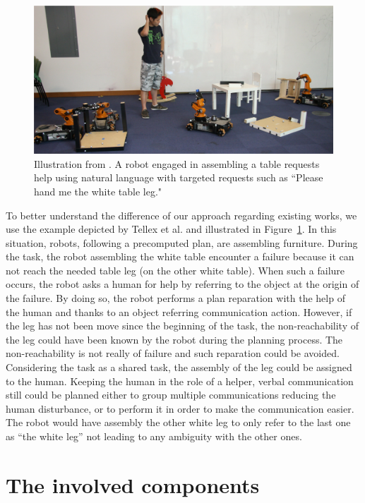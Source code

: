 \begin{figure}[!ht]
\centering
\includegraphics[scale=0.25]{figures/chapter5/tellex.png}
\caption{\label{fig:chap5_tellex} Illustration from \cite{tellex_2014_asking}.
A robot engaged in assembling a table requests help using natural language with targeted requests such as “Please hand me the white table leg." }
\end{figure}

To better understand the difference of our approach regarding existing works, we use the example depicted by Tellex et al. \cite{tellex_2014_asking} and illustrated in Figure~\ref{fig:chap5_tellex}. In this situation, robots, following a precomputed plan, are assembling furniture. During the task, the robot assembling the white table encounter a failure because it can not reach the needed table leg (on the other white table). When such a failure occurs, the robot asks a human for help by referring to the object at the origin of the failure. By doing so, the robot performs a plan reparation with the help of the human and thanks to an object referring communication action. However, if the leg has not been move since the beginning of the task, the non-reachability of the leg could have been known by the robot during the planning process. The non-reachability is not really of failure and such reparation could be avoided. Considering the task as a shared task, the assembly of the leg could be assigned to the human. Keeping the human in the role of a helper, verbal communication still could be planned either to group multiple communications reducing the human disturbance, or to perform it in order to make the communication easier. The robot would have assembly the other white leg to only refer to the last one as ``the white leg'' not leading to any ambiguity with the other ones.


\section{The involved components}

